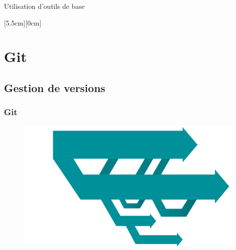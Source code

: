 \documentclass{beamer}
\begin{document}
\begin{frame}
\begin{block}{Utilisation d'outils de base}

\raisebox{0px}[5.5cm][0cm]{}

\end{block}
  
\end{frame}




\section{Git}
\subsection{Gestion de versions}

\begin{frame}
  \frametitle{Git}

    \begin{figure}
    \includegraphics[height=0.7\textheight]{images/branches}
    \end{figure}

\end{frame}
\end{document}
